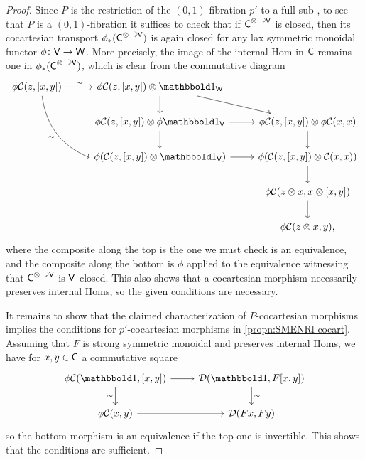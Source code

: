 \documentclass[a4paper,11pt]{article}
\begin{document}
\begin{proof}
  Since $P$ is the restriction of the $(0,1)$-fibration $p'$ to a full
  sub-\itcat{}, to see that $P$ is a $(0,1)$-fibration it suffices to check that if
  $\utract{C}{V}$ is closed, then its cocartesian transport
  $\phi_{*}(\utract{C}{V})$ is again
  closed for any lax symmetric monoidal functor
  $\phi \colon \uV \to \uW$. More precisely,
  the image of the internal Hom in $\textup{\textsf{C}}$ remains one in
  $\phi_{*}(\utract{C}{V})$, which is clear from the commutative
  diagram
  \[
    \begin{tikzcd}
      \phi\eC(z, [x,y]) \ar[r, "\sim"]  \ar[ddr, "\sim"', bend right] & \phi\eC(z, [x,y]) \otimes \bbone_{\uW} \ar[d] \ar[dr] \\
      & \phi\eC(z, [x,y]) \otimes \phi \bbone_{\uV} \ar[r]  \ar[d] & \phi \eC(z, [x,y]) \otimes \phi \eC(x,x) \ar[d] \\
      & \phi (\eC(z, [x,y]) \otimes \bbone_{\uV}) \ar[r] & \phi (\eC(z, [x,y]) \otimes \eC(x,x)) \ar[d] \\
      & & \phi \eC(z \otimes x, x \otimes [x,y]) \ar[d] \\
       & & \phi \eC(z \otimes x, y),
    \end{tikzcd}
  \]
  where the composite along the top is the one we must check is an
  equivalence, and the composite along the bottom is $\phi$ applied to
  the equivalence witnessing that $\utract{C}{V}$ is
  $\textup{\textsf{V}}$-closed. This also shows that a cocartesian morphism
  necessarily preserves internal Homs, so the given conditions are
  necessary.

  It remains to show that the claimed characterization of
  $P$-cocartesian
  morphisms implies the conditions for $p'$-cocartesian morphisms in \cref{propn:SMENRl
    cocart}. Assuming that $F$ is strong symmetric monoidal and preserves internal Homs, we have for
  $x, y \in \textup{\textsf{C}}$ a
  commutative square
  \[
    \begin{tikzcd}
     \phi \eC(\bbone, [x,y]) \ar[r] \ar[d, "\sim"'] & \eD(\bbone, F[x,y])  \ar[d, "\sim"] \\
     \phi \eC(x,y) \ar[r] & \eD(Fx,Fy)
    \end{tikzcd}
  \]
  so the bottom morphism is an equivalence if the top one is
  invertible. This shows that the conditions are sufficient.
\end{proof}
\end{document}

